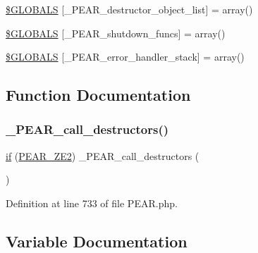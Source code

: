 \begin{DoxyCompactItemize}
\item 
\hyperlink{PEAR_8php_aa6e035215f421c936187dc93245dfa9c}{\$\+G\+L\+O\+B\+A\+LS} \mbox{[}\textquotesingle{}\+\_\+\+P\+E\+A\+R\+\_\+destructor\+\_\+object\+\_\+list\textquotesingle{}\mbox{]} = array()
\item 
\hyperlink{PEAR_8php_a1b8ec5f9024c084cb421fac6fa26a722}{\$\+G\+L\+O\+B\+A\+LS} \mbox{[}\textquotesingle{}\+\_\+\+P\+E\+A\+R\+\_\+shutdown\+\_\+funcs\textquotesingle{}\mbox{]} = array()
\item 
\hyperlink{PEAR_8php_a9fbcc5d2c4987f48d54d4c3723a8c5d6}{\$\+G\+L\+O\+B\+A\+LS} \mbox{[}\textquotesingle{}\+\_\+\+P\+E\+A\+R\+\_\+error\+\_\+handler\+\_\+stack\textquotesingle{}\mbox{]} = array()
\end{DoxyCompactItemize}


\subsection{Function Documentation}
\hypertarget{PEAR_8php_af9e3621e2aa4f0546c04ab675e5efca6}{}\label{PEAR_8php_af9e3621e2aa4f0546c04ab675e5efca6} 
\subsubsection{\texorpdfstring{\+\_\+\+P\+E\+A\+R\+\_\+call\+\_\+destructors()}{\_PEAR\_call\_destructors()}}
{\footnotesize\ttfamily \hyperlink{config_8inc_8php_a73b98c0274e28635a594091f9ca43cb4}{if} (\hyperlink{PEAR_8php_a16b6fef5a6547779f3d9d6e1b7c5c2b5}{P\+E\+A\+R\+\_\+\+Z\+E2}) \+\_\+\+P\+E\+A\+R\+\_\+call\+\_\+destructors (\begin{DoxyParamCaption}{ }\end{DoxyParamCaption})}



Definition at line 733 of file P\+E\+A\+R.\+php.



\subsection{Variable Documentation}
\hypertarget{PEAR_8php_afebfe34c0ac29a64ce790889963af69a}{}\label{PEAR_8php_afebfe34c0ac29a64ce790889963af69a} 
